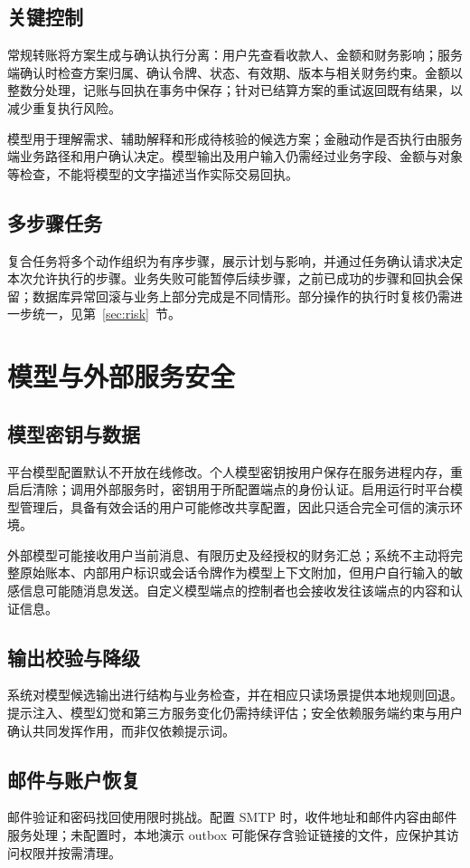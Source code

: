 \documentclass[journal,wp,nowatermark,nobib,clean]{paper}
\begin{document}
\subsection{关键控制}
常规转账将方案生成与确认执行分离：用户先查看收款人、金额和财务影响；服务端确认时检查方案归属、确认令牌、状态、有效期、版本与相关财务约束。金额以整数分处理，记账与回执在事务中保存；针对已结算方案的重试返回既有结果，以减少重复执行风险。

模型用于理解需求、辅助解释和形成待核验的候选方案；金融动作是否执行由服务端业务路径和用户确认决定。模型输出及用户输入仍需经过业务字段、金额与对象等检查，不能将模型的文字描述当作实际交易回执。

\subsection{多步骤任务}
复合任务将多个动作组织为有序步骤，展示计划与影响，并通过任务确认请求决定本次允许执行的步骤。业务失败可能暂停后续步骤，之前已成功的步骤和回执会保留；数据库异常回滚与业务上部分完成是不同情形。部分操作的执行时复核仍需进一步统一，见第~\ref{sec:risk}~节。

\section{模型与外部服务安全}
\subsection{模型密钥与数据}
平台模型配置默认不开放在线修改。个人模型密钥按用户保存在服务进程内存，重启后清除；调用外部服务时，密钥用于所配置端点的身份认证。启用运行时平台模型管理后，具备有效会话的用户可能修改共享配置，因此只适合完全可信的演示环境。

外部模型可能接收用户当前消息、有限历史及经授权的财务汇总；系统不主动将完整原始账本、内部用户标识或会话令牌作为模型上下文附加，但用户自行输入的敏感信息可能随消息发送。自定义模型端点的控制者也会接收发往该端点的内容和认证信息。

\subsection{输出校验与降级}
系统对模型候选输出进行结构与业务检查，并在相应只读场景提供本地规则回退。提示注入、模型幻觉和第三方服务变化仍需持续评估；安全依赖服务端约束与用户确认共同发挥作用，而非仅依赖提示词。

\subsection{邮件与账户恢复}
邮件验证和密码找回使用限时挑战。配置 SMTP 时，收件地址和邮件内容由邮件服务处理；未配置时，本地演示 outbox 可能保存含验证链接的文件，应保护其访问权限并按需清理。
\end{document}
